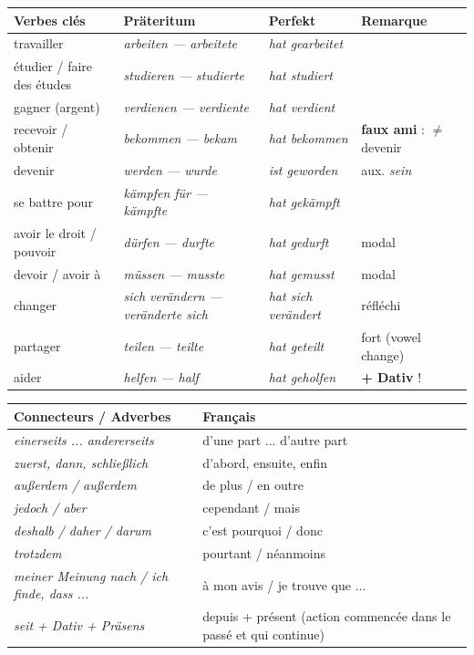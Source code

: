 \documentclass[11pt]{article}
\newcommand{\all}[1]{\ifmmode\text{\textit{#1}}\else\begingroup\selectlanguage{ngerman}\itshape #1\endgroup\fi}
\begin{document}
\begin{aretenir}
\begin{center}
\begin{tabularx}{\linewidth}{|X|X|X|X|}
\hline
\rowcolor{poporangeL} \textbf{Verbes clés} & \textbf{Präteritum} & \textbf{Perfekt} & \textbf{Remarque} \\
\hline
travailler & \all{arbeiten} — \all{arbeitete} & \all{hat gearbeitet} \\
étudier / faire des études & \all{studieren} — \all{studierte} & \all{hat studiert} \\
gagner (argent) & \all{verdienen} — \all{verdiente} & \all{hat verdient} \\
recevoir / obtenir & \all{bekommen} — \all{bekam} & \all{hat bekommen} & \textbf{faux ami} : $\neq$ devenir \\
devenir & \all{werden} — \all{wurde} & \all{ist geworden} & aux. \all{sein} \\
se battre pour & \all{kämpfen für} — \all{kämpfte} & \all{hat gekämpft} \\
avoir le droit / pouvoir & \all{dürfen} — \all{durfte} & \all{hat gedurft} & modal \\
devoir / avoir à & \all{müssen} — \all{musste} & \all{hat gemusst} & modal \\
changer & \all{sich verändern} — \all{veränderte sich} & \all{hat sich verändert} & réfléchi \\
partager & \all{teilen} — \all{teilte} & \all{hat geteilt} & fort (vowel change) \\
aider & \all{helfen} — \all{half} & \all{hat geholfen} & \textbf{+ Dativ} ! \\
\hline
\end{tabularx}
\end{center}

\begin{center}
\begin{tabularx}{\linewidth}{|X|X|}
\hline
\rowcolor{popgreenL} \textbf{Connecteurs / Adverbes} & \textbf{Français} \\
\hline
\all{einerseits ... andererseits} & d'une part ... d'autre part \\
\all{zuerst, dann, schließlich} & d'abord, ensuite, enfin \\
\all{außerdem / außerdem} & de plus / en outre \\
\all{jedoch / aber} & cependant / mais \\
\all{deshalb / daher / darum} & c'est pourquoi / donc \\
\all{trotzdem} & pourtant / néanmoins \\
\all{meiner Meinung nach / ich finde, dass ...} & à mon avis / je trouve que ... \\
\all{seit + Dativ + Präsens} & depuis + présent (action commencée dans le passé et qui continue) \\
\hline
\end{tabularx}
\end{center}
\end{aretenir}
\end{document}
